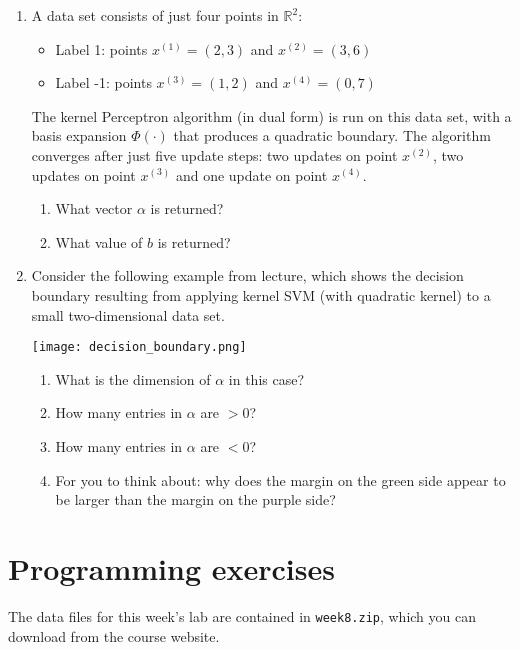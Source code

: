 \documentclass{article}
\begin{document}
\begin{enumerate}
    \item A data set consists of just four points in $\mathbb{R}^{2}$:
    \begin{itemize}
        \item Label 1: points $x^{(1)} = (2, 3)$ and $x^{(2)} = (3, 6)$
        \item Label -1: points $x^{(3)} = (1, 2)$ and $x^{(4)} = (0, 7)$
    \end{itemize}
    The kernel Perceptron algorithm (in dual form) is run on this data set, with a basis expansion $\Phi(\cdot)$ that produces a quadratic boundary. The algorithm converges after just five update steps: two updates on point $x^{(2)}$, two updates on point $x^{(3)}$ and one update on point $x^{(4)}$.
    \begin{enumerate}
        \item What vector $\alpha$ is returned?
        \item What value of $b$ is returned?
    \end{enumerate}

    \item Consider the following example from lecture, which shows the decision boundary resulting from applying kernel SVM (with quadratic kernel) to a small two-dimensional data set.

    \begin{center}
        \texttt{[image: decision\_boundary.png]}
    \end{center}

    \begin{enumerate}
        \item What is the dimension of $\alpha$ in this case?
        \item How many entries in $\alpha$ are $>0$?
        \item How many entries in $\alpha$ are $<0$?
        \item For you to think about: why does the margin on the green side appear to be larger than the margin on the purple side?
    \end{enumerate}
\end{enumerate}

\section*{Programming exercises}

The data files for this week's lab are contained in \texttt{week8.zip}, which you can download from the course website.
\end{document}
